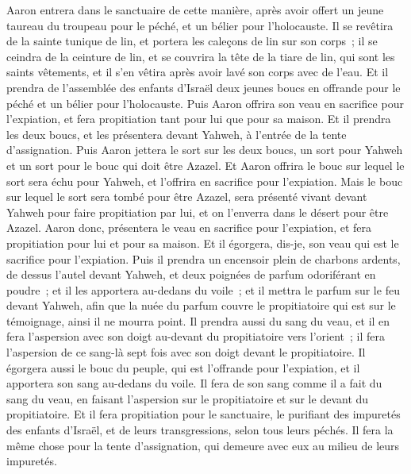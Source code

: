 \begin{multicols}{2}
Aaron entrera dans le sanctuaire de cette manière, après avoir offert un jeune taureau du troupeau pour le péché, et un bélier pour l'holocauste.
Il se revêtira de la sainte tunique de lin, et portera les caleçons de lin sur son corps~; il se ceindra de la ceinture de lin, et se couvrira la tête de la tiare de lin, qui sont les saints vêtements, et il s'en vêtira après avoir lavé son corps avec de l'eau.
Et il prendra de l'assemblée des enfants d'Israël deux jeunes boucs en offrande pour le péché et un bélier pour l'holocauste.
Puis Aaron offrira son veau en sacrifice pour l'expiation, et fera propitiation tant pour lui que pour sa maison.
Et il prendra les deux boucs, et les présentera devant Yahweh, à l'entrée de la tente d'assignation.
Puis Aaron jettera le sort sur les deux boucs, un sort pour Yahweh et un sort pour le bouc qui doit être Azazel.
Et Aaron offrira le bouc sur lequel le sort sera échu pour Yahweh, et l'offrira en sacrifice pour l'expiation.
Mais le bouc sur lequel le sort sera tombé pour être Azazel, sera présenté vivant devant Yahweh pour faire propitiation par lui, et on l'enverra dans le désert pour être Azazel.
Aaron donc, présentera le veau en sacrifice pour l'expiation, et fera propitiation pour lui et pour sa maison. Et il égorgera, dis-je, son veau qui est le sacrifice pour l'expiation.
Puis il prendra un encensoir plein de charbons ardents, de dessus l'autel devant Yahweh, et deux poignées de parfum odoriférant en poudre~; et il les apportera au-dedans du voile~;
et il mettra le parfum sur le feu devant Yahweh, afin que la nuée du parfum couvre le propitiatoire qui est sur le témoignage, ainsi il ne mourra point.
Il prendra aussi du sang du veau, et il en fera l'aspersion avec son doigt au-devant du propitiatoire vers l'orient~; il fera l'aspersion de ce sang-là sept fois avec son doigt devant le propitiatoire.
Il égorgera aussi le bouc du peuple, qui est l'offrande pour l'expiation, et il apportera son sang au-dedans du voile. Il fera de son sang comme il a fait du sang du veau, en faisant l'aspersion sur le propitiatoire et sur le devant du propitiatoire.
Et il fera propitiation pour le sanctuaire, le purifiant des impuretés des enfants d'Israël, et de leurs transgressions, selon tous leurs péchés. Il fera la même chose pour la tente d'assignation, qui demeure avec eux au milieu de leurs impuretés.

\end{multicols}
